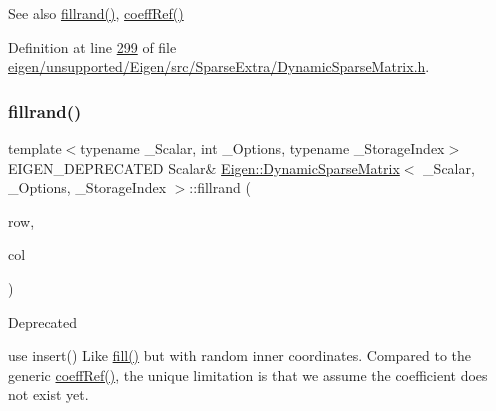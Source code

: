 \begin{DoxySeeAlso}{See also}
\hyperlink{class_eigen_1_1_dynamic_sparse_matrix_a6a5eb3c9d153d8ebdf4e0967321108e2}{fillrand()}, \hyperlink{class_eigen_1_1_dynamic_sparse_matrix_a17093cd39bd0e6ebd6250bc5feb61a0f}{coeff\+Ref()} 
\end{DoxySeeAlso}


Definition at line \hyperlink{eigen_2unsupported_2_eigen_2src_2_sparse_extra_2_dynamic_sparse_matrix_8h_source_l00299}{299} of file \hyperlink{eigen_2unsupported_2_eigen_2src_2_sparse_extra_2_dynamic_sparse_matrix_8h_source}{eigen/unsupported/\+Eigen/src/\+Sparse\+Extra/\+Dynamic\+Sparse\+Matrix.\+h}.

\mbox{\label{class_eigen_1_1_dynamic_sparse_matrix_a6a5eb3c9d153d8ebdf4e0967321108e2}} 
\subsubsection{\texorpdfstring{fillrand()}{fillrand()}\hspace{0.1cm}{\footnotesize\ttfamily [1/2]}}
{\footnotesize\ttfamily template$<$typename \+\_\+\+Scalar, int \+\_\+\+Options, typename \+\_\+\+Storage\+Index$>$ \\
E\+I\+G\+E\+N\+\_\+\+D\+E\+P\+R\+E\+C\+A\+T\+ED Scalar\& \hyperlink{class_eigen_1_1_dynamic_sparse_matrix}{Eigen\+::\+Dynamic\+Sparse\+Matrix}$<$ \+\_\+\+Scalar, \+\_\+\+Options, \+\_\+\+Storage\+Index $>$\+::fillrand (\begin{DoxyParamCaption}\item[{\hyperlink{group___core___module_a554f30542cc2316add4b1ea0a492ff02}{Index}}]{row,  }\item[{\hyperlink{group___core___module_a554f30542cc2316add4b1ea0a492ff02}{Index}}]{col }\end{DoxyParamCaption})\hspace{0.3cm}{\ttfamily [inline]}}

\begin{DoxyRefDesc}{Deprecated}
\item[\hyperlink{deprecated__deprecated000087}{Deprecated}]use insert() Like \hyperlink{class_eigen_1_1_dynamic_sparse_matrix_a70c8f529b38fd5b7d93d6dfe1a122723}{fill()} but with random inner coordinates. Compared to the generic \hyperlink{class_eigen_1_1_dynamic_sparse_matrix_a17093cd39bd0e6ebd6250bc5feb61a0f}{coeff\+Ref()}, the unique limitation is that we assume the coefficient does not exist yet. \end{DoxyRefDesc}


